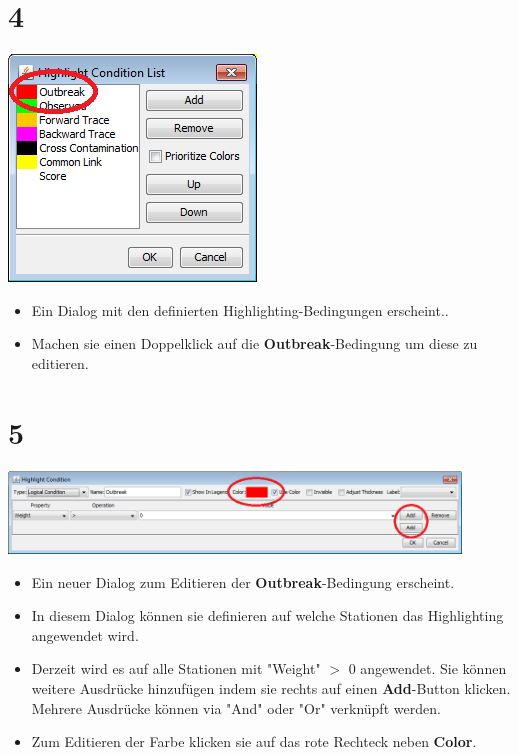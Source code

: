 \documentclass{beamer}
\begin{document}
\section{4}
\begin{frame}
	\begin{center}
  		\includegraphics[height=0.6\textheight]{4.png}
	\end{center}
	\begin{itemize}
		\item Ein Dialog mit den definierten Highlighting-Bedingungen erscheint..
		\item Machen sie einen Doppelklick auf die \textbf{Outbreak}-Bedingung um diese zu editieren.
	\end{itemize}
\end{frame}

\section{5}
\begin{frame}
	\begin{center}
  		\includegraphics[width=0.9\textwidth]{5.png}
	\end{center}
	\begin{itemize}
		\item Ein neuer Dialog zum Editieren der \textbf{Outbreak}-Bedingung erscheint.
		\item In diesem Dialog können sie definieren auf welche Stationen das Highlighting angewendet wird.
		\item Derzeit wird es auf alle Stationen mit "Weight" $>$ 0 angewendet. Sie können weitere Ausdrücke hinzufügen indem sie rechts auf einen \textbf{Add}-Button klicken. Mehrere Ausdrücke können via "And" oder "Or" verknüpft werden.
		\item Zum Editieren der Farbe klicken sie auf das rote Rechteck neben \textbf{Color}.
	\end{itemize}
\end{frame}
\end{document}
